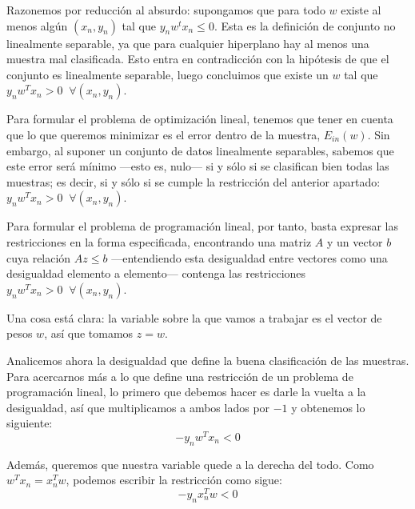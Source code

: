 \documentclass[a4paper, 11pt]{article}
\begin{document}
      \begin{solucion}
        Razonemos por reducción al absurdo: supongamos que para todo $w$ existe al menos algún $(x_n, y_n)$ tal que $y_nw^tx_n \leq 0$. Esta es la definición de conjunto no linealmente separable, ya que para cualquier hiperplano hay al menos una muestra mal clasificada. Esto entra en contradicción con la hipótesis de que el conjunto es linealmente separable, luego concluimos que existe un $w$ tal que $y_n w^T x_n > 0 \;\; \forall (x_n,y_n)$.

        Para formular el problema de optimización lineal, tenemos que tener en cuenta que lo que queremos minimizar es el error dentro de la muestra, $E_{in}(w)$. Sin embargo, al suponer un conjunto de datos linealmente separables, sabemos que este error será mínimo ---esto es, nulo--- si y sólo si se clasifican bien todas las muestras; es decir, si y sólo si se cumple la restricción del anterior apartado: $y_n w^T x_n > 0 \;\; \forall (x_n,y_n)$.

        Para formular el problema de programación lineal, por tanto, basta expresar las restricciones en la forma especificada, encontrando una matriz $A$ y un vector $b$ cuya relación $Az \leq b$ ---entendiendo esta desigualdad entre vectores como una desigualdad elemento a elemento--- contenga las restricciones $y_n w^T x_n > 0 \;\; \forall (x_n,y_n)$.

        Una cosa está clara: la variable sobre la que vamos a trabajar es el vector de pesos $w$, así que tomamos $z = w$.

        Analicemos ahora la desigualdad que define la buena clasificación de las muestras. Para acercarnos más a lo que define una restricción de un problema de programación lineal, lo primero que debemos hacer es darle la vuelta a la desigualdad, así que multiplicamos a ambos lados por $-1$ y obtenemos lo siguiente:
        \[
        -y_n w^T x_n < 0
        \]

        Además, queremos que nuestra variable quede a la derecha del todo. Como $w^T x_n = x_n^T w$, podemos escribir la restricción como sigue:
        \[
        -y_n x_n^T w < 0
        \]


\end{solucion}
\end{document}
